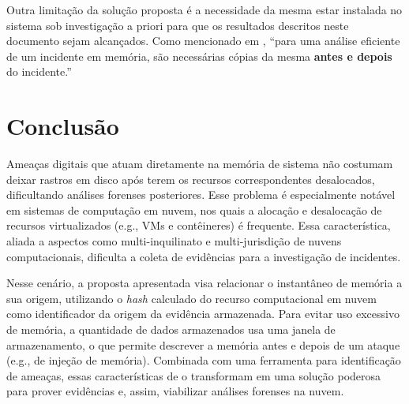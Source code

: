 %
Outra limitação da solução proposta é a necessidade da mesma estar instalada no sistema sob investigação a priori para que os resultados descritos neste documento sejam alcançados. 
%
Como mencionado em \cite{CaseMemoryForensics:2014}, ``para uma análise eficiente de um incidente em memória, são necessárias cópias da mesma \textbf{antes e depois} do incidente.''

\chapter{Conclusão}
\label{sec:proposta-concl}

%
Ameaças digitais que atuam diretamente na memória de sistema não costumam deixar rastros em disco após terem os recursos correspondentes desalocados, dificultando análises forenses posteriores.
%
Esse problema é especialmente notável em sistemas de computação em nuvem, nos quais a alocação e desalocação de recursos virtualizados (e.g., VMs e contêineres) é frequente.
%
Essa característica, aliada a aspectos como multi-inquilinato e multi-jurisdição de nuvens computacionais, dificulta a coleta de evidências para a investigação de incidentes.


Nesse cenário, a proposta apresentada visa relacionar o instantâneo de memória a sua origem, utilizando o \textit{hash} calculado do recurso computacional em nuvem como identificador da origem da evidência armazenada.
%
Para evitar uso excessivo de memória, a quantidade de dados armazenados usa uma janela de armazenamento, o que permite descrever a memória antes e depois de um ataque (e.g., de injeção de memória). 
%
Combinada com uma ferramenta para identificação de ameaças, essas características de \fancyname o transformam em uma solução poderosa para prover evidências e, assim, viabilizar análises forenses na nuvem.
%
%
%

